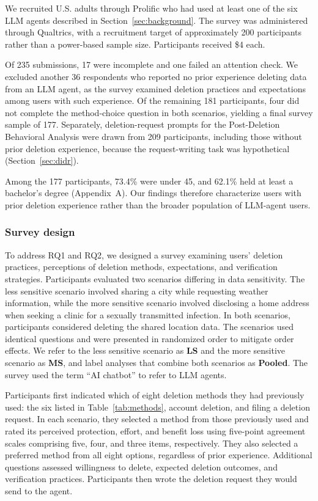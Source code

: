 We recruited U.S. adults through Prolific who had used at least one of the six LLM agents described in Section~\ref{sec:background}. The survey was administered through Qualtrics, with a recruitment target of approximately 200 participants rather than a power-based sample size. Participants received \$4 each.

Of 235 submissions, 17 were incomplete and one failed an attention check. We excluded another 36 respondents who reported no prior experience deleting data from an LLM agent, as the survey examined deletion practices and expectations among users with such experience. Of the remaining 181 participants, four did not complete the method-choice question in both scenarios, yielding a final survey sample of 177. Separately, deletion-request prompts for the Post-Deletion Behavioral Analysis were drawn from 209 participants, including those without prior deletion experience, because the request-writing task was hypothetical (Section~\ref{sec:didr}).

Among the 177 participants, 73.4\% were under 45, and 62.1\% held at least a bachelor's degree (Appendix~A). Our findings therefore characterize users with prior deletion experience rather than the broader population of LLM-agent users.

\subsubsection{Survey design}

To address RQ1 and RQ2, we designed a survey examining users' deletion practices, perceptions of deletion methods, expectations, and verification strategies. Participants evaluated two scenarios differing in data sensitivity. The less sensitive scenario involved sharing a city while requesting weather information, while the more sensitive scenario involved disclosing a home address when seeking a clinic for a sexually transmitted infection. In both scenarios, participants considered deleting the shared location data. The scenarios used identical questions and were presented in randomized order to mitigate order effects. We refer to the less sensitive scenario as \textbf{LS} and the more sensitive scenario as \textbf{MS}, and label analyses that combine both scenarios as \textbf{Pooled}. The survey used the term ``AI chatbot'' to refer to LLM agents.

Participants first indicated which of eight deletion methods they had previously used: the six listed in Table~\ref{tab:methods}, account deletion, and filing a deletion request. In each scenario, they selected a method from those previously used and rated its perceived protection, effort, and benefit loss using five-point agreement scales comprising five, four, and three items, respectively. They also selected a preferred method from all eight options, regardless of prior experience. Additional questions assessed willingness to delete, expected deletion outcomes, and verification practices. Participants then wrote the deletion request they would send to the agent.

